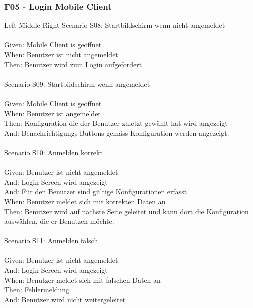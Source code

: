 \subsubsection*{F05 - Login Mobile Client}
\begin{tabbing}
    Left \= Middle \= Right \kill
    Scenario S08: \> \>  Startbildschirm wenn nicht angemeldet\\ \\
    Given: \> \>   Mobile Client is geöffnet\\
    When: \> \>  Benutzer ist nicht angemeldet\\
    Then: \> \>  Benutzer wird zum Login aufgefordert\\
    \\
    Scenario S09: \> \>  Startbildschirm wenn angemeldet\\ \\
    Given: \> \>   Mobile Client is geöffnet\\
    When: \> \>  Benutzer ist angemeldet\\
    Then: \> \>  Konfiguration die der Benutzer zuletzt gewählt hat wird angezeigt\\
    And: \> \>    Benachrichtigungs Buttons gemäss Konfiguration werden angezeigt.\\
    \\
    Scenario S10: \> \>  Anmelden korrekt\\ \\
    Given: \> \>  Benutzer ist nicht angemeldet\\
    And: \> \>    Login Screen wird angezeigt\\
    And: \> \>     Für den Benutzer sind gültige Konfigurationen erfasst\\
    When: \> \>   Benutzer meldet sich mit korrekten Daten an\\
    Then: \> \>   Benutzer wird auf nächste Seite geleitet und kann dort die Konfiguration auswählen, die er Benutzen möchte.\\
    \\
    Scenario S11: \> \>  Anmelden falsch\\ \\
    Given: \> \>  Benutzer ist nicht angemeldet\\
    And: \> \>    Login Screen wird angezeigt\\
    When: \> \>   Benutzer meldet sich mit falschen Daten an\\
    Then: \> \>   Fehlermeldung\\
    And: \> \>  Benutzer wird nicht weitergeleitet\\

\end{tabbing}
